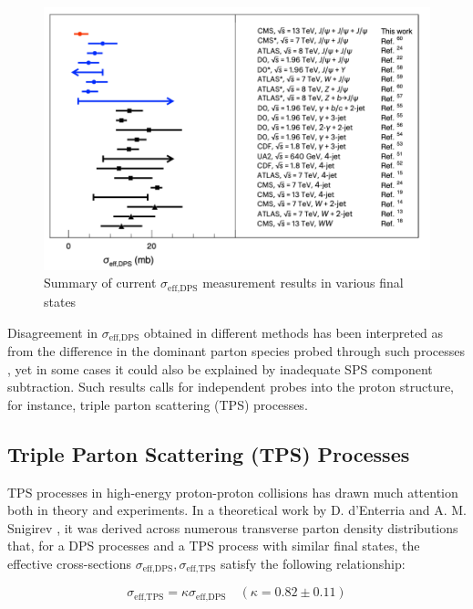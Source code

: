 \documentclass[10pt,twocolumn]{article}
\newcommand*{\effXsecDPS}{\sigma_{\text{eff,DPS}}}
\newcommand*{\effXsecTPS}{\sigma_{\text{eff,TPS}}}
\begin{document}
\begin{figure}
    \centering
    \includegraphics[width=1.0\linewidth]{images/sigma_eff_DPS_summary.png}
    \caption{Summary of current $\effXsecDPS$ measurement results in various final states\cite{CMS_TRI_JPSI}}
    \label{fig:sigma-eff-dps-summary}
\end{figure}

Disagreement in $\effXsecDPS$ obtained in different methods has been interpreted as from the difference in the dominant parton species probed through such processes \cite{MPI_at_LHC}, yet in some cases it could also be explained by inadequate SPS component subtraction. Such results calls for independent probes into the proton structure, for instance, triple parton scattering (TPS) processes.

\subsection{Triple Parton Scattering (TPS) Processes}

TPS processes in high-energy proton-proton collisions has drawn much attention both in theory and experiments. In a theoretical work by D. d'Enterria and A. M. Snigirev \cite{DdE_TPS}, it was derived across numerous transverse parton density distributions that, for a DPS processes and a TPS process with similar final states, the effective cross-sections $\effXsecDPS, \effXsecTPS$ satisfy the following relationship:

\begin{equation}
    \label{eqn:dps_tps_eff_xsec}
    \effXsecTPS = \kappa \effXsecDPS \quad (\kappa = 0.82 \pm  0.11)
\end{equation}
\end{document}
